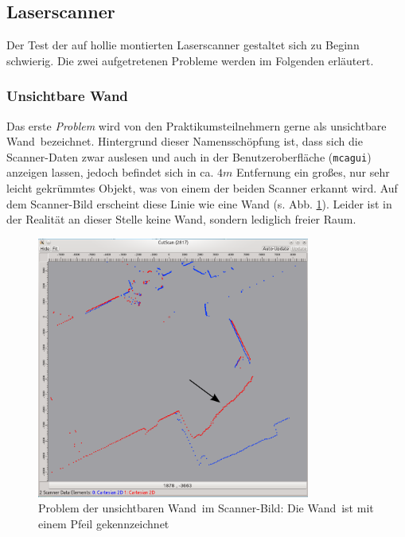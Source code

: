 \subsection{Laserscanner}
\label{test_schwierigkeiten_laserscanner_sec}

Der Test der auf \gls{hollie} montierten Laserscanner gestaltet sich zu Beginn schwierig.
Die zwei aufgetretenen Probleme werden im Folgenden erläutert.

\subsubsection{\glqq Unsichtbare Wand\grqq}

Das erste \emph{Problem} wird von den Praktikumsteilnehmern gerne als \glqq unsichtbare Wand\grqq\ bezeichnet.
Hintergrund dieser Namensschöpfung ist, dass sich die Scanner-Daten zwar auslesen und auch in der Benutzeroberfläche (\lstinline{mcagui}) anzeigen lassen, jedoch befindet sich in ca. $4m$ Entfernung ein großes, nur sehr leicht gekrümmtes Objekt, was von einem der beiden Scanner erkannt wird.
Auf dem Scanner-Bild erscheint diese Linie wie eine Wand (s. Abb. \ref{fig:scanner_problem}).
Leider ist in der Realität an dieser Stelle keine Wand, sondern lediglich freier Raum.

\begin{figure}[h]
	\centering
	\includegraphics[width=0.8\textwidth]{graphics/cutscan_fehler}
	\caption[\glqq Unsichtbare Wand\grqq]{Problem der \glqq unsichtbaren Wand\grqq\ im Scanner-Bild: Die \glqq Wand\grqq\ ist mit einem Pfeil gekennzeichnet}
	\label{fig:scanner_problem}
\end{figure}

